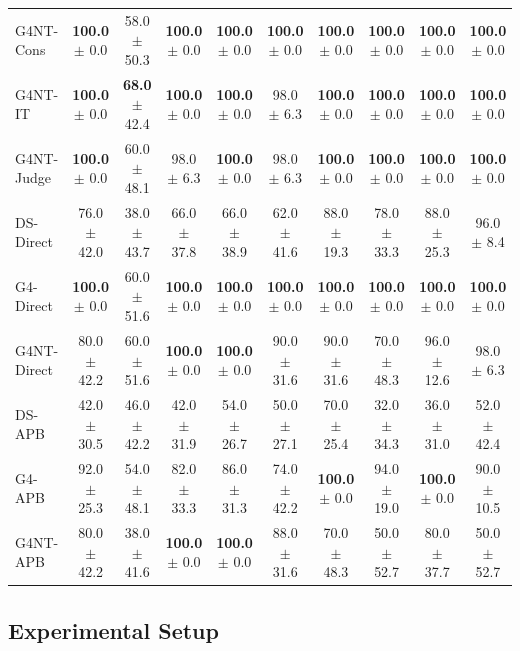 \begin{table}[t]
{\begin{tabular}{l|ccccc|cccc}
\midrule
G4NT-Cons   & \textbf{100.0} $\pm$ 0.0 & 58.0 $\pm$ 50.3 & \textbf{100.0} $\pm$ 0.0 & \textbf{100.0} $\pm$ 0.0 & \textbf{100.0} $\pm$ 0.0 & \textbf{100.0} $\pm$ 0.0 & \textbf{100.0} $\pm$ 0.0 & \textbf{100.0} $\pm$ 0.0 & \textbf{100.0} $\pm$ 0.0 \\
G4NT-IT     & \textbf{100.0} $\pm$ 0.0 & \textbf{68.0} $\pm$ 42.4 & \textbf{100.0} $\pm$ 0.0 & \textbf{100.0} $\pm$ 0.0 & 98.0 $\pm$ 6.3 & \textbf{100.0} $\pm$ 0.0 & \textbf{100.0} $\pm$ 0.0 & \textbf{100.0} $\pm$ 0.0 & \textbf{100.0} $\pm$ 0.0 \\
G4NT-Judge  & \textbf{100.0} $\pm$ 0.0 & 60.0 $\pm$ 48.1 & 98.0 $\pm$ 6.3 & \textbf{100.0} $\pm$ 0.0 & 98.0 $\pm$ 6.3 & \textbf{100.0} $\pm$ 0.0 & \textbf{100.0} $\pm$ 0.0 & \textbf{100.0} $\pm$ 0.0 & \textbf{100.0} $\pm$ 0.0 \\
\midrule
DS-Direct   & 76.0 $\pm$ 42.0 & 38.0 $\pm$ 43.7 & 66.0 $\pm$ 37.8 & 66.0 $\pm$ 38.9 & 62.0 $\pm$ 41.6 & 88.0 $\pm$ 19.3 & 78.0 $\pm$ 33.3 & 88.0 $\pm$ 25.3 & 96.0 $\pm$ 8.4 \\
G4-Direct   & \textbf{100.0} $\pm$ 0.0 & 60.0 $\pm$ 51.6 & \textbf{100.0} $\pm$ 0.0 & \textbf{100.0} $\pm$ 0.0 & \textbf{100.0} $\pm$ 0.0 & \textbf{100.0} $\pm$ 0.0 & \textbf{100.0} $\pm$ 0.0 & \textbf{100.0} $\pm$ 0.0 & \textbf{100.0} $\pm$ 0.0 \\
G4NT-Direct & 80.0 $\pm$ 42.2 & 60.0 $\pm$ 51.6 & \textbf{100.0} $\pm$ 0.0 & \textbf{100.0} $\pm$ 0.0 & 90.0 $\pm$ 31.6 & 90.0 $\pm$ 31.6 & 70.0 $\pm$ 48.3 & 96.0 $\pm$ 12.6 & 98.0 $\pm$ 6.3 \\
\midrule
DS-APB      & 42.0 $\pm$ 30.5 & 46.0 $\pm$ 42.2 & 42.0 $\pm$ 31.9 & 54.0 $\pm$ 26.7 & 50.0 $\pm$ 27.1 & 70.0 $\pm$ 25.4 & 32.0 $\pm$ 34.3 & 36.0 $\pm$ 31.0 & 52.0 $\pm$ 42.4 \\
G4-APB      & 92.0 $\pm$ 25.3 & 54.0 $\pm$ 48.1 & 82.0 $\pm$ 33.3 & 86.0 $\pm$ 31.3 & 74.0 $\pm$ 42.2 & \textbf{100.0} $\pm$ 0.0 & 94.0 $\pm$ 19.0 & \textbf{100.0} $\pm$ 0.0 & 90.0 $\pm$ 10.5 \\
G4NT-APB    & 80.0 $\pm$ 42.2 & 38.0 $\pm$ 41.6 & \textbf{100.0} $\pm$ 0.0 & \textbf{100.0} $\pm$ 0.0 & 88.0 $\pm$ 31.6 & 70.0 $\pm$ 48.3 & 50.0 $\pm$ 52.7 & 80.0 $\pm$ 37.7 & 50.0 $\pm$ 52.7 \\
\bottomrule
\end{tabular}}
\end{table}

\subsection{Experimental Setup}

